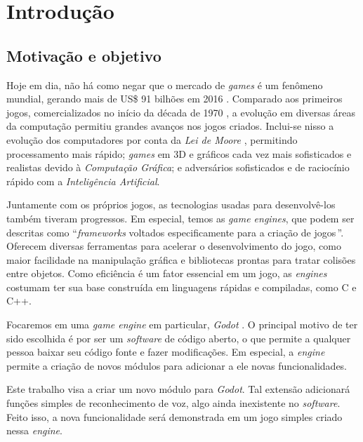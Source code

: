 \chapter{Introdução}
\label{cap:introducao}


\section{Motivação e objetivo}

Hoje em dia, não há como negar que o mercado de \emph{games} é um fenômeno mundial,
gerando mais de US\$ 91 bilhões em 2016 \citep{gameMarket:16}. Comparado aos
primeiros jogos, comercializados no início da década de 1970
\citep{gameMarketOrigin}, a evolução em diversas áreas da computação permitiu
grandes avanços nos jogos criados. Inclui-se nisso a evolução dos computadores por
conta da \emph{Lei de Moore} \citep{moore}, permitindo processamento mais rápido;
\emph{games} em 3D e gráficos cada vez mais sofisticados e realistas devido à
\emph{Computação Gráfica}; e adversários sofisticados e de raciocínio rápido com a
\emph{Inteligência Artificial}.

Juntamente com os próprios jogos, as tecnologias usadas para desenvolvê-los também
tiveram progressos. Em especial, temos as \emph{game engines}, que podem ser
descritas como \textquotedblleft \emph{frameworks} voltados especificamente para a
criação de jogos\,\textquotedblright\:\citep{gameEngine:13}. Oferecem diversas
ferramentas para acelerar o desenvolvimento do jogo, como maior facilidade na
manipulação gráfica e bibliotecas prontas para tratar colisões entre objetos. Como
eficiência é um fator essencial em um jogo, as \emph{engines} costumam ter sua base
construída em linguagens rápidas e compiladas, como C e C++.

Focaremos em uma \emph{game engine} em particular, \emph{Godot} \citep{godot}. O
principal motivo de ter sido escolhida é por ser um \emph{software} de código
aberto, o que permite a qualquer pessoa baixar seu código fonte e fazer
modificações. Em especial, a \emph{engine} permite a criação de novos módulos para
adicionar a ele novas funcionalidades.

Este trabalho visa a criar um novo módulo para \emph{Godot}. Tal extensão adicionará
funções simples de reconhecimento de voz, algo ainda inexistente no \emph{software}.
Feito isso, a nova funcionalidade será demonstrada em um jogo simples criado nessa
\emph{engine}.

